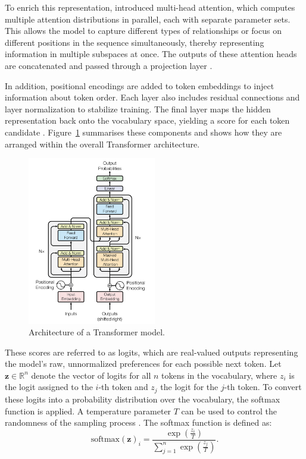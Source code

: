 \documentclass[a4paper,oneside,bibliography=totoc]{scrbook}
\begin{document}
To enrich this representation, \citet{Vaswani2023} introduced multi-head attention, which computes multiple attention distributions in parallel, each with separate parameter sets. This allows the model to capture different types of relationships or focus on different positions in the sequence simultaneously, thereby representing information in multiple subspaces at once. The outputs of these attention heads are concatenated and passed through a projection layer \cite{Vaswani2023}.

In addition, positional encodings are added to token embeddings to inject information about token order. Each layer also includes residual connections and layer normalization to stabilize training. The final layer maps the hidden representation back onto the vocabulary space, yielding a score for each token candidate \cite{Vaswani2023}. Figure~\ref{fig:transformer} summarises these components and shows how they are arranged within the overall Transformer architecture.

\begin{figure}[t]
  \centering
  \includegraphics[width=0.5\textwidth]{figures/Transformer.png}
  \caption[Architecture of a Transformer model]{Architecture of a Transformer model. \cite{Vaswani2023}}
  \label{fig:transformer}
\end{figure}

These scores are referred to as logits, which are real-valued outputs representing the model’s raw, unnormalized preferences for each possible next token. Let $\mathbf{z} \in \mathbb{R}^n$ denote the vector of logits for all $n$ tokens in the vocabulary, where $z_i$ is the logit assigned to the $i$-th token and $z_j$ the logit for the $j$-th token. To convert these logits into a probability distribution over the vocabulary, the softmax function is applied. A temperature parameter $T$ can be used to control the randomness of the sampling process \cite{Peeperkorn2024}. The softmax function is defined as:
\begin{equation}
  \label{eq:softmax}
  \mathrm{softmax}(\mathbf{z})_i = \frac{\exp\left(\frac{z_i}{T}\right)}{\sum_{j=1}^{n} \exp\left(\frac{z_j}{T}\right)}.
\end{equation}
\end{document}
